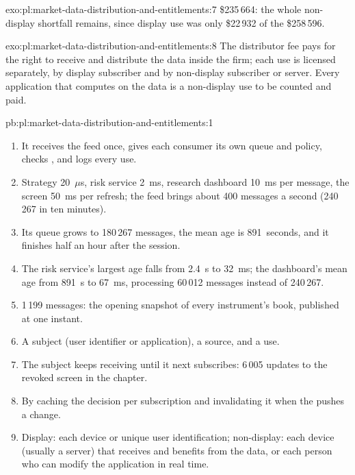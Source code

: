 \begin{solution}{exo:pl:market-data-distribution-and-entitlements:7}
\$235\,664: the whole non-display shortfall remains, since display use was only \$22\,932 of the \$258\,596.
\end{solution}

\begin{solution}{exo:pl:market-data-distribution-and-entitlements:8}
The distributor fee pays for the right to receive and distribute the data inside the firm; each use is licensed separately, by display
subscriber and by non-display subscriber or server. Every application that computes on the data is a non-display use to be counted and paid.
\end{solution}

\begin{solution}{pb:pl:market-data-distribution-and-entitlements:1}
\begin{enumerate}
\item It receives the feed once, gives each consumer its own queue and policy, checks , and logs every use.
\item Strategy 20~$\mu$s, risk service 2~ms, research dashboard 10~ms per message, the screen 50~ms per refresh; the feed brings about 400
messages a second (240\,267 in ten minutes).
\item Its queue grows to 180\,267 messages, the mean age is 891~seconds, and it finishes half an hour after the session.
\item The risk service's largest age falls from 2.4~s to 32~ms; the dashboard's mean age from 891~s to 67~ms, processing 60\,012 messages
instead of 240\,267.
\item 1\,199 messages: the opening snapshot of every instrument's book, published at one instant.
\item A subject (user identifier or application), a source, and a use.
\item The subject keeps receiving until it next subscribes: 6\,005 updates to the revoked screen in the chapter.
\item By caching the decision per subscription and invalidating it when the  pushes a change.
\item Display: each device or unique user identification; non-display: each device (usually a server) that receives and benefits from the
data, or each person who can modify the application in real time.

\end{enumerate}
\end{solution}
